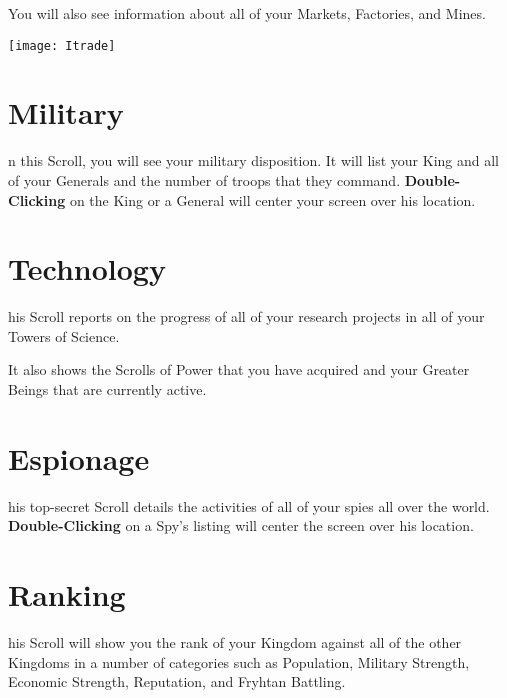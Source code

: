 You will also see information about all of your Markets, Factories, and Mines.

\begin{center}
	\texttt{[image: Itrade]}
\end{center}

\section{\textsf{Military}}


n this Scroll, you will see your military disposition. It will list your King and all of your Generals and the number of troops that they command. \textbf{Double-Clicking} on the King or a General will center your screen over his location.

\section{\textsf{Technology}}


his Scroll reports on the progress of all of your research projects in all of your Towers of Science.

It also shows the Scrolls of Power that you have acquired and your Greater Beings that are currently active.

\section{\textsf{Espionage}}


his top-secret Scroll details the activities of all of your spies all over the world. \textbf{Double-Clicking} on a Spy’s listing will center the screen over his location.

\section{\textsf{Ranking}}


his Scroll will show you the rank of your Kingdom against all of the other Kingdoms in a number of categories such as Population, Military Strength, Economic Strength, Reputation, and Fryhtan Battling.

